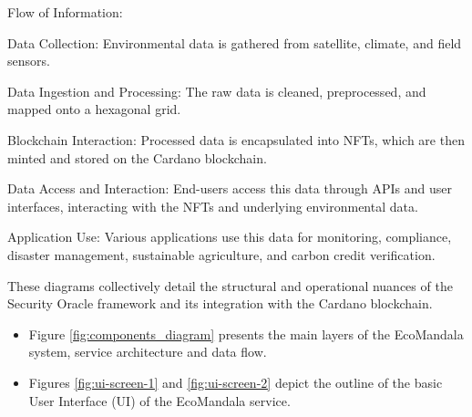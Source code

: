 \documentclass{scrreport}
\begin{document}
Flow of Information:

\begin{description}

    \item{Data Collection:} Environmental data is gathered from satellite, climate, and field sensors.

    \item{Data Ingestion and Processing:} The raw data is cleaned, preprocessed, and mapped onto a hexagonal grid.

    \item{Blockchain Interaction:} Processed data is encapsulated into NFTs, which are then minted and stored on the Cardano blockchain.

    \item{Data Access and Interaction:} End-users access this data through APIs and user interfaces, interacting with the NFTs and underlying environmental data.

    \item{Application Use:} Various applications use this data for monitoring, compliance, disaster management, sustainable agriculture, and carbon credit verification.

\end{description}

These diagrams collectively detail the structural and operational nuances of the Security Oracle framework and its integration with the Cardano blockchain.

\begin{itemize}
    \item Figure \ref{fig:components_diagram} presents the main layers of the EcoMandala system, service architecture and data flow.
    \item Figures \ref{fig:ui-screen-1} and \ref{fig:ui-screen-2} depict the outline of the basic User Interface (UI) of the EcoMandala service.
\end{itemize}
\end{document}
